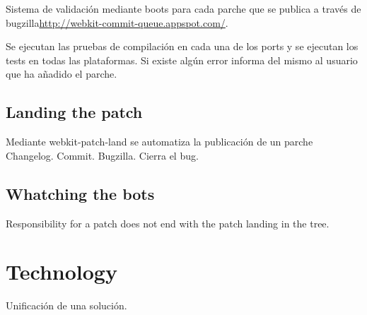 \documentclass[11pt]{scrartcl}
\begin{document}
Sistema de validación mediante boots para cada parche que se publica a través de bugzilla\url{http://webkit-commit-queue.appspot.com/}.

Se ejecutan las pruebas de compilación en cada una de los ports y se ejecutan los tests en todas las plataformas. Si existe algún error informa del mismo al usuario que ha añadido el parche.


\subsection{Landing the patch}
\label{sub:patch}

Mediante webkit-patch-land se automatiza la publicación de un parche
Changelog.
Commit.
Bugzilla.
Cierra el bug.


\subsection{Whatching the bots}
\label{sub:wtbots}

Responsibility for a patch does not end with the patch landing in the tree.

\section{Technology}
\label{sec:technology}

Unificación de una solución.

\end{document}
